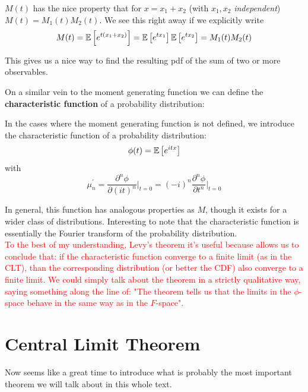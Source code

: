$M(t)$ has the nice property that for $x=x_1+x_2$ (with $x_1,x_2$ \emph{independent}) $M(t)=M_1(t)M_2(t)$. We see this right away if we explicitly write 
	\[
	M(t) = \mathbb{E}\left[ e^{t(x_1+x_2)}\right] = \mathbb{E}\left[ e^{tx_1}\right]\mathbb{E}\left[ e^{tx_2}\right] = M_1(t)M_2(t)
	\]
	
This gives us a nice way to find the resulting pdf of the sum of two or more observables.

On a similar vein to the moment generating function we can define the \textbf{characteristic function} of a probability distribution:

\begin{definition}
	In the cases where the moment generating function is not defined, we introduce the characteristic function of a probability distribution:
	\[
	\phi(t) = \mathbb{E}\left[ e^{itx} \right]
	\]
	with
	\[
	\mu_n^\prime = \frac{\partial^n \phi}{\partial (it)^n}\bigg\rvert_{t=0} = (-i)^n\frac{\partial^n \phi}{\partial t^n}\bigg\rvert_{t=0}
	\]
\end{definition}

In general, this function has analogous properties as $M$, though it exists for a wider class of distributions. Interesting to note that the characteristic function is essentially the Fourier transform of the probability distribution. \\
\textcolor{red}{To the best of my understanding, Levy's theorem it's useful because allows us to conclude that: if the characteristic function converge to a finite limit (as in the CLT), than the corresponding distribution (or better the CDF) also converge to a finite limit. We could simply talk about the theorem in a strictly qualitative way, saying something along the line of: "The theorem tells us that the limits in the $\phi$-space behave in the same way as in the $F$-space".}

\section{Central Limit Theorem}
Now seems like a great time to introduce what is probably the most important theorem we will talk about in this whole text. 

